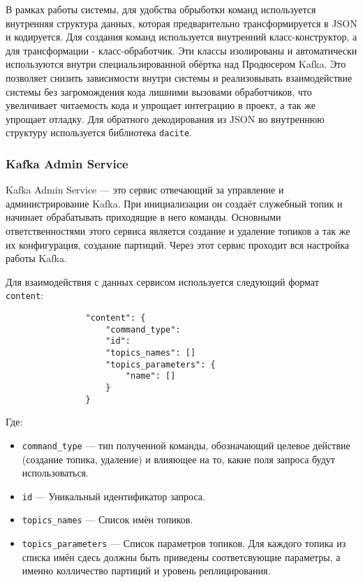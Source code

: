             В рамках работы системы, для удобства обрыботки команд используется внутренняя структура данных, которая предварительно трансформируется в JSON и кодируется. Для создания команд используется внутренний класс-конструктор, а для трансформации - класс-обработчик. Эти классы изолированы и автоматически используются внутри специальзированной обёртка над Продюсером Kafka. Это позволяет снизить зависимости внутри системы и реализовывать взаимодействие системы без загромождения кода лишними вызовами обработчиков, что увеличивает читаемость кода и упрощает интеграцию в проект, а так же упрощает отладку. Для обратного декодирования из JSON во внутреннюю структуру используется библиотека \texttt{dacite}.

        \subsubsection{Kafka Admin Service}
            Kafka Admin Service — это сервис отвечающий за управление и администрирование Kafka. При инициализации он создаёт служебный топик и начинает обрабатывать приходящие в него команды. Основными ответственностями этого сервиса является создание и удаление топиков а так же их конфигурация, создание партиций. Через этот сервис проходит вся настройка работы Kafka.  

            Для взаимодействия с данных сервисом используется следующий формат \texttt{content}:
            \begin{lstlisting}
                "content": {
                    "command_type":
                    "id":
                    "topics_names": []
                    "topics_parameters": {
                        "name": []
                    }
                }
            \end{lstlisting}
            Где:
            \begin{itemize}
                \item \texttt{command\_type} — тип полученной команды, обозначающий целевое действие (создание топика, удаление) и влияющее на то, какие поля запроса будут использоваться.
                \item \texttt{id} — Уникальный идентификатор запроса.
                \item \texttt{topics\_names} — Список имён топиков.
                \item \texttt{topics\_parameters} — Список параметров топиков. Для каждого топика из списка имён сдесь должны быть приведены соответсвующие параметры, а именно колличество партиций и уровень реплицирования.
            \end{itemize}


